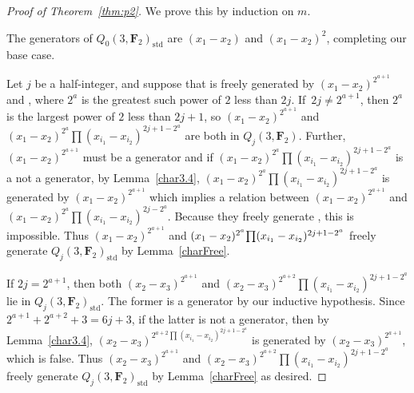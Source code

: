 \documentclass[11pt]{article}
\numberwithin{equation}{section}
\theoremstyle{definition}
\numberwithin{equation}{section}
\newcommand{\std}{\mathrm{std}}
\begin{document}
\begin{proof}[Proof of Theorem~\ref{thm:p2}]
 We prove this by induction on $m$.

 The generators of $Q_0(3,\mathbf{F}_2)_{\std}$ are $(x_1-x_2)$ and $(x_1-x_2)^2$, completing our base case.

 Let $j$ be a half-integer, and suppose that \smash{$Q_{j-\frac{1}{2}}(3,\mathbf{F}_2)_\std$} is freely generated by $(x_1-x_2)^{2^{a+1}}$ and ,
 where $2^a$ is the greatest such power of $2$ less than $2j$. If~${2j\neq 2^{a+1}}$, then $2^{a}$ is the largest power of $2$ less than $2j+1$, so $(x_1-x_2)^{2^{a+1}}$ and $(x_1-x_2)^{2^a}\prod (x_{i_1}-x_{i_2})^{2j+1-2^a}$ are both in $Q_j(3,\mathbf{F}_2)$. Further, $(x_1-x_2)^{2^{a+1}}$ must be a generator and if $(x_1-x_2)^{2^a}\prod (x_{i_1}-x_{i_2})^{2j+1-2^a}$ is a not a generator, by Lemma~\ref{char3.4}, $(x_1-x_2)^{2^a}\prod (x_{i_1}-x_{i_2})^{2j+1-2^a}$ is generated by $(x_1-x_2)^{2^{a+1}}$ which implies a relation between $(x_1-x_2)^{2^{a+1}}$ and ${(x_1-x_2)^{2^a}\prod (x_{i_1}-x_{i_2})^{2j-2^a}}$. Because they freely generate , this is impossible. Thus $(x_1-x_2)^{2^{a+1}}$ and $(x_1-x_2)^{2^a}\smash{\prod (x_{i_1}-x_{i_2})^{2j+1-2^a}}$ freely generate $Q_j(3,\mathbf{F}_2)_{\std}$ by Lemma~\ref{charFree}.

 If $2j= 2^{a+1}$, then both $(x_2-x_3)^{2^{a+1}}$ and $(x_2-x_3)^{2^{a+2}}\prod (x_{i_1}-x_{i_2})^{2j+1-2^a}$ lie in $Q_j(3,\mathbf{F}_2)_{\std}$. The former is a generator by our inductive hypothesis.
 Since $2^{a+1}+2^{a+2}+3=6j+3$, if the latter is not a generator, then by Lemma~\ref{char3.4}, $(x_2-x_3)^{2^{a+2}\prod (x_{i_1}-x_{i_2})^{2j+1-2^a}}$ is generated by $(x_2-x_3)^{2^{a+1}}$, which is false. Thus $(x_2-x_3)^{2^{a+1}}$ and $(x_2-x_3)^{2^{a+2}}\prod (x_{i_1}-x_{i_2})^{2j+1-2^a}$ freely generate $Q_j(3,\mathbf{F}_2)_{\std}$ by Lemma~\ref{charFree} as desired.
\end{proof}
\clearpage
\end{document}
